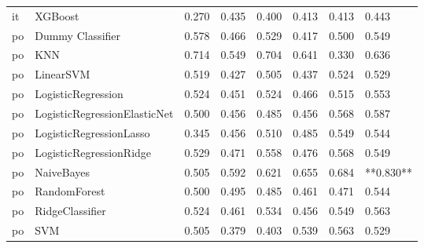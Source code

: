 \begin{tabular}{llllllll}
      it &                      XGBoost & 0.270 &                     0.435 &                 0.400 &                  0.413 &                                   0.413 &     0.443 \\
      po &             Dummy Classifier & 0.578 &                     0.466 &                 0.529 &                  0.417 &                                   0.500 &     0.549 \\
      po &                          KNN & 0.714 &                     0.549 &                 0.704 &                  0.641 &                                   0.330 &     0.636 \\
      po &                    LinearSVM & 0.519 &                     0.427 &                 0.505 &                  0.437 &                                   0.524 &     0.529 \\
      po &           LogisticRegression & 0.524 &                     0.451 &                 0.524 &                  0.466 &                                   0.515 &     0.553 \\
      po & LogisticRegressionElasticNet & 0.500 &                     0.456 &                 0.485 &                  0.456 &                                   0.568 &     0.587 \\
      po &      LogisticRegressionLasso & 0.345 &                     0.456 &                 0.510 &                  0.485 &                                   0.549 &     0.544 \\
      po &      LogisticRegressionRidge & 0.529 &                     0.471 &                 0.558 &                  0.476 &                                   0.568 &     0.549 \\
      po &                   NaiveBayes & 0.505 &                     0.592 &                 0.621 &                  0.655 &                                   0.684 & **0.830** \\
      po &                 RandomForest & 0.500 &                     0.495 &                 0.485 &                  0.461 &                                   0.471 &     0.544 \\
      po &              RidgeClassifier & 0.524 &                     0.461 &                 0.534 &                  0.456 &                                   0.549 &     0.563 \\
      po &                          SVM & 0.505 &                     0.379 &                 0.403 &                  0.539 &                                   0.563 &     0.529 \\

\end{tabular}

